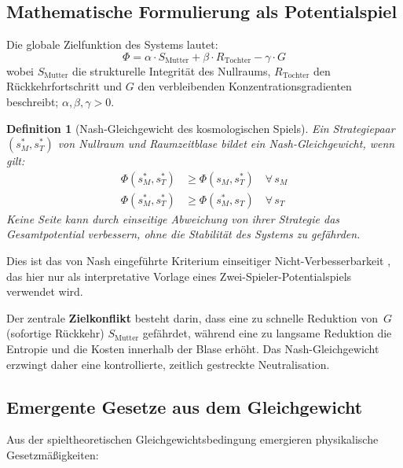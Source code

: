 \documentclass[aps,prd,twocolumn,superscriptaddress,nofootinbib]{revtex4-2}
\newtheorem{definition}{Definition}
\begin{document}
\subsection{Mathematische Formulierung als Potentialspiel}
\label{subsec:potentialspiel}

Die globale Zielfunktion des Systems lautet:
\begin{equation}
\Phi = \alpha \cdot S_{\mathrm{Mutter}} + \beta \cdot R_{\mathrm{Tochter}} - \gamma \cdot G
\label{eq:potential}
\end{equation}
wobei $S_{\mathrm{Mutter}}$ die strukturelle Integrit\"at des Nullraums, $R_{\mathrm{Tochter}}$ den R\"uckkehrfortschritt und $G$ den verbleibenden Konzentrationsgradienten beschreibt; $\alpha, \beta, \gamma > 0$.

\begin{definition}[Nash-Gleichgewicht des kosmologischen Spiels]
Ein Strategiepaar $(s_M^*, s_T^*)$ von Nullraum und Raumzeitblase bildet ein Nash-Gleichgewicht, wenn gilt:
\begin{align}
\Phi(s_M^*, s_T^*) &\geq \Phi(s_M, s_T^*) \quad \forall\, s_M \\
\Phi(s_M^*, s_T^*) &\geq \Phi(s_M^*, s_T) \quad \forall\, s_T
\end{align}
Keine Seite kann durch einseitige Abweichung von ihrer Strategie das Gesamtpotential verbessern, ohne die Stabilit\"at des Systems zu gef\"ahrden.
\end{definition}

Dies ist das von Nash eingef\"uhrte Kriterium einseitiger Nicht-Verbesserbarkeit \cite{Nash1950}, das hier nur als interpretative Vorlage eines Zwei-Spieler-Potentialspiels verwendet wird.

Der zentrale \textbf{Zielkonflikt} besteht darin, dass eine zu schnelle Reduktion von~$G$ (sofortige R\"uckkehr) $S_{\mathrm{Mutter}}$ gef\"ahrdet, w\"ahrend eine zu langsame Reduktion die Entropie und die Kosten innerhalb der Blase erh\"oht. Das Nash-Gleichgewicht erzwingt daher eine kontrollierte, zeitlich gestreckte Neutralisation.

\subsection{Emergente Gesetze aus dem Gleichgewicht}
\label{subsec:emergente_gesetze}

Aus der spieltheoretischen Gleichgewichtsbedingung emergieren physikalische Gesetzm\"a\ss{}igkeiten:
\end{document}
